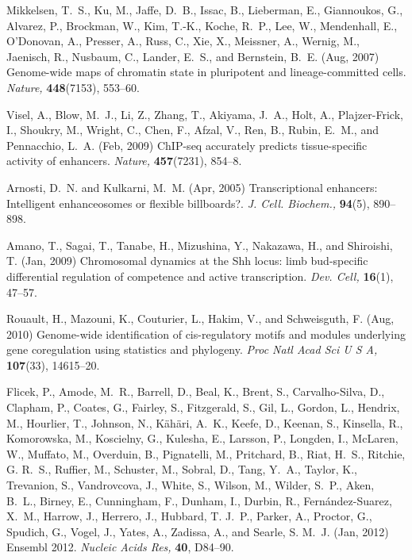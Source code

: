 \documentclass[a4,center,fleqn]{NAR}
\begin{document}
\begin{thebibliography}{10}
Mikkelsen, T.~S., Ku, M., Jaffe, D.~B., Issac, B., Lieberman, E., Giannoukos,
  G., Alvarez, P., Brockman, W., Kim, T.-K., Koche, R.~P., Lee, W., Mendenhall,
  E., O'Donovan, A., Presser, A., Russ, C., Xie, X., Meissner, A., Wernig, M.,
  Jaenisch, R., Nusbaum, C., Lander, E.~S., and Bernstein, B.~E. (Aug, 2007)
Genome-wide maps of chromatin state in pluripotent and lineage-committed cells.
{\em Nature,} {\bf 448}(7153), 553--60.

Visel, A., Blow, M.~J., Li, Z., Zhang, T., Akiyama, J.~A., Holt, A.,
  Plajzer-Frick, I., Shoukry, M., Wright, C., Chen, F., Afzal, V., Ren, B.,
  Rubin, E.~M., and Pennacchio, L.~A. (Feb, 2009)
ChIP-seq accurately predicts tissue-specific activity of enhancers.
{\em Nature,} {\bf 457}(7231), 854--8.

Arnosti, D.~N. and Kulkarni, M.~M. (Apr, 2005)
{{T}ranscriptional enhancers: {I}ntelligent enhanceosomes or flexible
  billboards?}.
{\em J. Cell. Biochem.,} {\bf 94}(5), 890--898.

Amano, T., Sagai, T., Tanabe, H., Mizushina, Y., Nakazawa, H., and Shiroishi,
  T. (Jan, 2009)
{{C}hromosomal dynamics at the {S}hh locus: limb bud-specific differential
  regulation of competence and active transcription}.
{\em Dev. Cell,} {\bf 16}(1), 47--57.

Rouault, H., Mazouni, K., Couturier, L., Hakim, V., and Schweisguth, F. (Aug,
  2010)
Genome-wide identification of cis-regulatory motifs and modules underlying gene
  coregulation using statistics and phylogeny.
{\em Proc Natl Acad Sci U S A,} {\bf 107}(33), 14615--20.

Flicek, P., Amode, M.~R., Barrell, D., Beal, K., Brent, S., Carvalho-Silva, D.,
  Clapham, P., Coates, G., Fairley, S., Fitzgerald, S., Gil, L., Gordon, L.,
  Hendrix, M., Hourlier, T., Johnson, N., K{\"a}h{\"a}ri, A.~K., Keefe, D.,
  Keenan, S., Kinsella, R., Komorowska, M., Koscielny, G., Kulesha, E.,
  Larsson, P., Longden, I., McLaren, W., Muffato, M., Overduin, B., Pignatelli,
  M., Pritchard, B., Riat, H.~S., Ritchie, G. R.~S., Ruffier, M., Schuster, M.,
  Sobral, D., Tang, Y.~A., Taylor, K., Trevanion, S., Vandrovcova, J., White,
  S., Wilson, M., Wilder, S.~P., Aken, B.~L., Birney, E., Cunningham, F.,
  Dunham, I., Durbin, R., Fern{\'a}ndez-Suarez, X.~M., Harrow, J., Herrero, J.,
  Hubbard, T. J.~P., Parker, A., Proctor, G., Spudich, G., Vogel, J., Yates,
  A., Zadissa, A., and Searle, S. M.~J. (Jan, 2012)
Ensembl 2012.
{\em Nucleic Acids Res,} {\bf 40}, D84--90.


\end{thebibliography}
\end{document}
